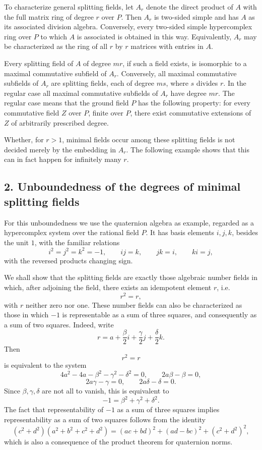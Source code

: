 \documentclass[11pt]{article}
\begin{document}
To characterize general splitting fields, let \(A_r\) denote the direct
product of \(A\) with the full matrix ring of degree \(r\) over \(P\).
Then \(A_r\) is two-sided simple and has \(A\) as its associated
division algebra. Conversely, every two-sided simple hypercomplex ring
over \(P\) to which \(A\) is associated is obtained in this way.
Equivalently, \(A_r\) may be characterized as the ring of all \(r\) by
\(r\) matrices with entries in \(A\).

Every splitting field of \(A\) of degree \(mr\), if such a field exists,
is isomorphic to a maximal commutative subfield of \(A_r\). Conversely,
all maximal commutative subfields of \(A_r\) are splitting fields, each
of degree \(ms\), where \(s\) divides \(r\). In the regular case all
maximal commutative subfields of \(A_r\) have degree \(mr\). The regular
case means that the ground field \(P\) has the following property: for
every commutative field \(Z\) over \(P\), finite over \(P\), there exist
commutative extensions of \(Z\) of arbitrarily prescribed degree.

Whether, for \(r>1\), minimal fields occur among these splitting fields
is not decided merely by the embedding in \(A_r\). The following example
shows that this can in fact happen for infinitely many \(r\).

\subsection{2. Unboundedness of the degrees of minimal splitting
fields}\label{unboundedness-of-the-degrees-of-minimal-splitting-fields}

For this unboundedness we use the quaternion algebra as example,
regarded as a hypercomplex system over the rational field \(P\). It has
basis elements \(i,j,k\), besides the unit \(1\), with the familiar
relations \[
  i^2=j^2=k^2=-1,
  \qquad ij=k,
  \qquad jk=i,
  \qquad ki=j,
\] with the reversed products changing sign.

We shall show that the splitting fields are exactly those algebraic
number fields in which, after adjoining the field, there exists an
idempotent element \(r\), i.e. \[
  r^2=r,
\] with \(r\) neither zero nor one. These number fields can also be
characterized as those in which \(-1\) is representable as a sum of
three squares, and consequently as a sum of two squares. Indeed, write
\[
  r=a+\frac{\beta}{2}i+
       \frac{\gamma}{2}j+
       \frac{\delta}{2}k.
\] Then \[
  r^2=r
\] is equivalent to the system \[
  4a^2-4a-\beta^2-\gamma^2-\delta^2=0,
  \qquad
  2a\beta-\beta=0,
\] \[
  2a\gamma-\gamma=0,
  \qquad
  2a\delta-\delta=0.
\] Since \(\beta,\gamma,
\delta\) are not all to vanish, this is equivalent to \[
  -1=\beta^2+
\gamma^2+\delta^2.
\] The fact that representability of \(-1\) as a sum of three squares
implies representability as a sum of two squares follows from the
identity \[
  (c^2+d^2)(a^2+b^2+c^2+d^2)
  =(ac+bd)^2+(ad-bc)^2+(c^2+d^2)^2,
\] which is also a consequence of the product theorem for quaternion
norms.
\end{document}
